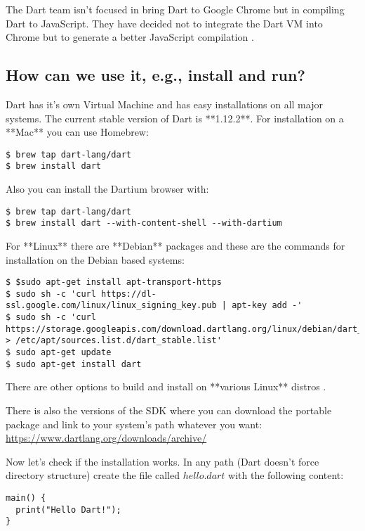The Dart team isn't focused in bring Dart to Google Chrome but in compiling Dart
to JavaScript. They have decided not to integrate the Dart VM into
Chrome but to generate a better JavaScript compilation \cite{3_10}
 \cite{3_11}.

\subsection{How can we use it, e.g., install and run?}

Dart has it's own Virtual Machine and has easy installations on all major
systems. The current stable version of Dart is **1.12.2**. For installation on a
**Mac** you can use Homebrew:

\begin{verbatim}
$ brew tap dart-lang/dart
$ brew install dart
\end{verbatim}

Also you can install the Dartium browser with:

\begin{verbatim}
$ brew tap dart-lang/dart
$ brew install dart --with-content-shell --with-dartium
\end{verbatim}

For **Linux** there are **Debian** packages and these are the commands for
installation on the Debian based systems:

\begin{verbatim}
$ $sudo apt-get install apt-transport-https
$ sudo sh -c 'curl https://dl-ssl.google.com/linux/linux_signing_key.pub | apt-key add -'
$ sudo sh -c 'curl https://storage.googleapis.com/download.dartlang.org/linux/debian/dart_stable.list > /etc/apt/sources.list.d/dart_stable.list'
$ sudo apt-get update
$ sudo apt-get install dart
\end{verbatim}

There are other options to build and install on **various Linux** distros \cite{3_12}.

There is also the versions of the SDK where you can download the portable
package and link to your system's path whatever you want: \url{https://www.dartlang.org/downloads/archive/}

Now let's check if the installation works. In any path (Dart doesn't force
directory structure) create the file called $hello.dart$ with the following
content:

\begin{lstlisting}[label=dhw,caption=Dart Hello World]
main() {
  print("Hello Dart!");
}
\end{lstlisting}

